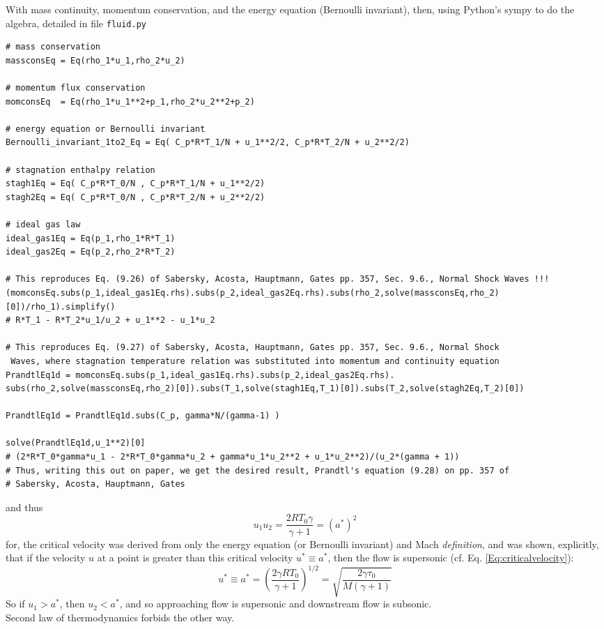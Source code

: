\documentclass[twoside,landscape,10pt]{amsart}
\theoremstyle{plain}
\theoremstyle{definition}
\theoremstyle{remark}
\theoremstyle{remark}
\begin{document}
\begin{multicols*}{2}
With mass continuity, momentum conservation, and the energy equation (Bernoulli invariant), then, using Python's sympy to do the algebra, detailed in file \verb|fluid.py|
\begin{lstlisting}
# mass conservation
massconsEq = Eq(rho_1*u_1,rho_2*u_2)

# momentum flux conservation
momconsEq  = Eq(rho_1*u_1**2+p_1,rho_2*u_2**2+p_2)

# energy equation or Bernoulli invariant
Bernoulli_invariant_1to2_Eq = Eq( C_p*R*T_1/N + u_1**2/2, C_p*R*T_2/N + u_2**2/2)

# stagnation enthalpy relation
stagh1Eq = Eq( C_p*R*T_0/N , C_p*R*T_1/N + u_1**2/2)
stagh2Eq = Eq( C_p*R*T_0/N , C_p*R*T_2/N + u_2**2/2)

# ideal gas law
ideal_gas1Eq = Eq(p_1,rho_1*R*T_1)
ideal_gas2Eq = Eq(p_2,rho_2*R*T_2)

# This reproduces Eq. (9.26) of Sabersky, Acosta, Hauptmann, Gates pp. 357, Sec. 9.6., Normal Shock Waves !!!
(momconsEq.subs(p_1,ideal_gas1Eq.rhs).subs(p_2,ideal_gas2Eq.rhs).subs(rho_2,solve(massconsEq,rho_2)[0])/rho_1).simplify()
# R*T_1 - R*T_2*u_1/u_2 + u_1**2 - u_1*u_2

# This reproduces Eq. (9.27) of Sabersky, Acosta, Hauptmann, Gates pp. 357, Sec. 9.6., Normal Shock
 Waves, where stagnation temperature relation was substituted into momentum and continuity equation
PrandtlEq1d = momconsEq.subs(p_1,ideal_gas1Eq.rhs).subs(p_2,ideal_gas2Eq.rhs).
subs(rho_2,solve(massconsEq,rho_2)[0]).subs(T_1,solve(stagh1Eq,T_1)[0]).subs(T_2,solve(stagh2Eq,T_2)[0])

PrandtlEq1d = PrandtlEq1d.subs(C_p, gamma*N/(gamma-1) )

solve(PrandtlEq1d,u_1**2)[0]
# (2*R*T_0*gamma*u_1 - 2*R*T_0*gamma*u_2 + gamma*u_1*u_2**2 + u_1*u_2**2)/(u_2*(gamma + 1))
# Thus, writing this out on paper, we get the desired result, Prandtl's equation (9.28) on pp. 357 of 
# Sabersky, Acosta, Hauptmann, Gates
\end{lstlisting}
and thus
\[
u_1u_2 = \frac{2RT_0\gamma}{\gamma +1} = (a^*)^2
\]
for, the critical velocity was derived from only the energy equation (or Bernoulli invariant) and Mach \emph{definition}, and was shown, explicitly, that if the velocity $u$ at a point is greater than this critical velocity $u^*\equiv a^*$, then the flow is supersonic (cf. Eq. \ref{Eq:criticalvelocity}):
\[
u^* \equiv a^*  = \left( \frac{2\gamma RT_0 }{ \gamma + 1 } \right)^{1/2} = \sqrt{ \frac{2\gamma \tau_0}{M(\gamma +1) } }
\]
So if $u_1 > a^*$, then $u_2 < a^*$, and so approaching flow is supersonic and downstream flow is subsonic.   \\
Second law of thermodynamics forbids the other way.


\end{multicols*}
\end{document}
